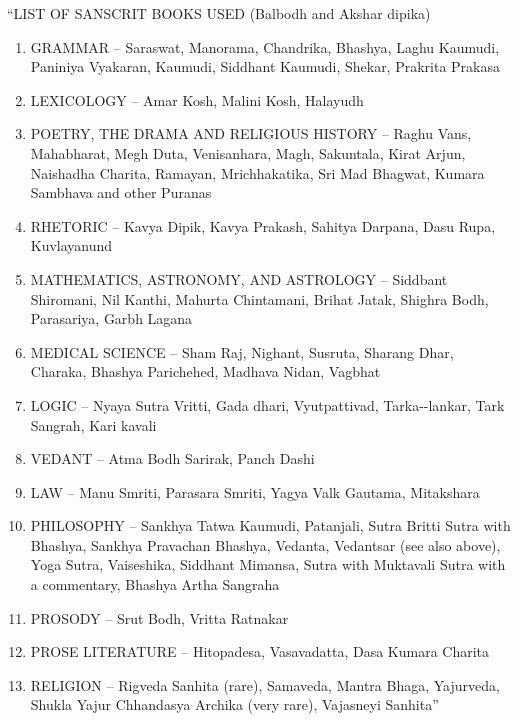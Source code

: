 “LIST OF SANSCRIT BOOKS USED (Balbodh and Akshar dipika)

\vspace{-.2cm}

\begin{enumerate}
\itemsep=0pt
\item GRAMMAR – Saraswat, Manorama, Chandrika, Bhashya, Laghu Kaumudi, Paniniya Vyakaran, Kaumudi, Siddhant Kaumudi, Shekar, Prakrita Prakasa

 \item LEXICOLOGY – Amar Kosh, Malini Kosh, Halayudh

 \item POETRY, THE DRAMA AND RELIGIOUS HISTORY – Raghu Vans, Mahabharat, Megh Duta, Venisanhara, Magh, Sakuntala, Kirat Arjun, Naishadha Charita, Ramayan, Mrichhakatika, Sri Mad Bhagwat, Kumara Sambhava and other Puranas

 \item RHETORIC – Kavya Dipik, Kavya Prakash, Sahitya Darpana, Dasu Rupa, Kuvlayanund

 \item MATHEMATICS, ASTRONOMY, AND ASTROLOGY – Siddbant Shiromani, Nil Kanthi, Mahurta Chintamani, Brihat Jatak, Shighra Bodh, Parasariya, Garbh Lagana

 \item MEDICAL SCIENCE – Sham Raj, Nighant, Susruta, Sharang Dhar, Charaka, Bhashya Parichehed, Madhava Nidan, Vagbhat

 \item LOGIC – Nyaya Sutra Vritti, Gada dhari, Vyutpattivad, Tarka-\break -lankar, Tark Sangrah, Kari kavali

 \item VEDANT – Atma Bodh Sarirak, Panch Dashi

 \item LAW – Manu Smriti, Parasara Smriti, Yagya Valk Gautama, Mitakshara

 \item PHILOSOPHY – Sankhya Tatwa Kaumudi, Patanjali, Sutra Britti Sutra with Bhashya, Sankhya Pravachan Bhashya, Vedanta, Vedantsar (see also above), Yoga Sutra, Vaiseshika, Siddhant Mimansa, Sutra with Muktavali Sutra with a commentary, Bhashya Artha Sangraha

 \item PROSODY – Srut Bodh, Vritta Ratnakar

 \item PROSE LITERATURE – Hitopadesa, Vasavadatta, Dasa Kumara Charita

 \item RELIGION – Rigveda Sanhita (rare), Samaveda, Mantra Bhaga, Yajurveda, Shukla Yajur Chhandasya Archika (very rare), Vajasneyi Sanhita”

\end{enumerate}

